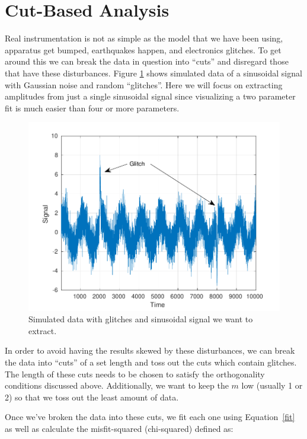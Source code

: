 \documentclass{article}
\begin{document}
\section{Cut-Based Analysis}

Real instrumentation is not as simple as the model that we have been using, apparatus get bumped, earthquakes happen, and electronics glitches. To get around this we can break the data in question into ``cuts'' and disregard those that have these disturbances. Figure \ref{raw} shows simulated data of a sinusoidal signal with Gaussian noise and random ``glitches''.  Here we will focus on extracting amplitudes from just a single sinusoidal signal since visualizing a two parameter fit is much easier than four or more parameters. 


\begin{figure}[!h]
\begin{centering}
\includegraphics[width=\textwidth]{RawData.pdf}
\caption{Simulated data with glitches and sinusoidal signal we want to extract.}\label{raw}
\end{centering}
\end{figure}

In order to avoid having the results skewed by these disturbances, we can break the data into ``cuts'' of a set length and toss out the cuts which contain glitches. The length of these cuts needs to be chosen to satisfy the orthogonality conditions discussed above. Additionally, we want to keep the $m$ low (usually 1 or 2) so that we toss out the least amount of data.

Once we've broken the data into these cuts, we fit each one using Equation~\ref{fit} as well as calculate the misfit-squared (chi-squared) defined as:
\end{document}
